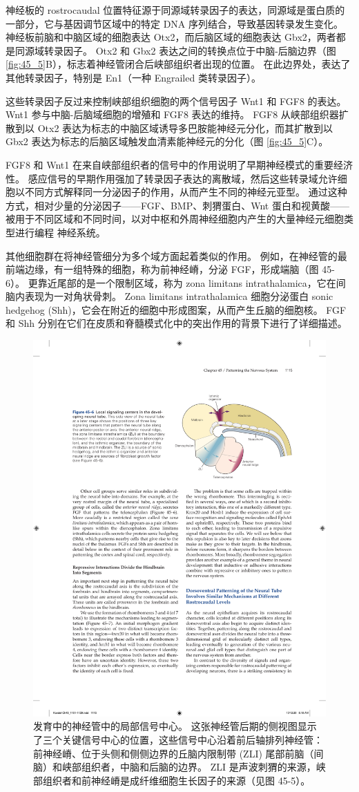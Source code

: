 神经板的 rostrocaudal 位置特征源于同源域转录因子的表达，同源域是蛋白质的一部分，它与基因调节区域中的特定 DNA 序列结合，导致基因转录发生变化。 神经板前脑和中脑区域的细胞表达 Otx2，而后脑区域的细胞表达 Gbx2，两者都是同源域转录因子。 Otx2 和 Gbx2 表达之间的转换点位于中脑-后脑边界（图 \ref{fig:45_5}B），标志着神经管闭合后峡部组织者出现的位置。 在此边界处，表达了其他转录因子，特别是 En1（一种 Engrailed 类转录因子）。

这些转录因子反过来控制峡部组织细胞的两个信号因子 Wnt1 和 FGF8 的表达。 Wnt1 参与中脑-后脑域细胞的增殖和 FGF8 表达的维持。 FGF8 从峡部组织器扩散到以 Otx2 表达为标志的中脑区域诱导多巴胺能神经元分化，而其扩散到以 Gbx2 表达为标志的后脑区域触发血清素能神经元的分化（图 \ref{fig:45_5}C）。

FGF8 和 Wnt1 在来自峡部组织者的信号中的作用说明了早期神经模式的重要经济性。 感应信号的早期作用强加了转录因子表达的离散域，然后这些转录域允许细胞以不同方式解释同一分泌因子的作用，从而产生不同的神经元亚型。 通过这种方式，相对少量的分泌因子——FGF、BMP、刺猬蛋白、Wnt 蛋白和视黄酸——被用于不同区域和不同时间，以对中枢和外周神经细胞内产生的大量神经元细胞类型进行编程 神经系统。

其他细胞群在将神经管细分为多个域方面起着类似的作用。 例如，在神经管的最前端边缘，有一组特殊的细胞，称为前神经嵴，分泌 FGF，形成端脑（图 45-6）。 
更靠近尾部的是一个限制区域，称为 zona limitans intrathalamica，它在间脑内表现为一对角状骨刺。 Zona limitans intrathalamica 细胞分泌蛋白 sonic hedgehog (Shh)，它会在附近的细胞中形成图案，从而产生丘脑的细胞核。 FGF 和 Shh 分别在它们在皮质和脊髓模式化中的突出作用的背景下进行了详细描述。

\begin{figure}[htbp]
	\centering
	\includegraphics[width=0.6\linewidth]{chap45/fig_45_6}
	\caption{发育中的神经管中的局部信号中心。 这张神经管后期的侧视图显示了三个关键信号中心的位置，这些信号中心沿着前后轴排列神经管：前神经嵴、位于头侧和侧侧边界的丘脑内限制带 (ZLI) 尾部前脑（间脑）和峡部组织者，中脑和后脑的边界。 ZLI 是声波刺猬的来源，峡部组织者和前神经嵴是成纤维细胞生长因子的来源（见图 45-5）。}
	\label{fig:45_6}
\end{figure}

